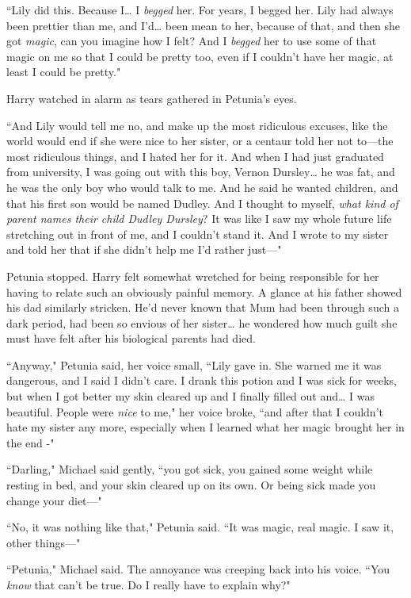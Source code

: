 ``Lily did this. Because I{\ldots} I \emph{begged} her. For years, I
begged her. Lily had always been prettier than me, and
I'd{\ldots} been mean to her, because of that, and then she
got \emph{magic}, can you imagine how I felt? And I \emph{begged} her
to use some of that magic on me so that I could be
pretty too, even if I couldn't have her magic, at least I
could be pretty."

Harry watched in alarm as tears gathered in Petunia's eyes.

``And Lily would tell me no, and make up the most
ridiculous excuses, like the world would end if she were
nice to her sister, or a centaur told her not to---the most
ridiculous things, and I hated her for it. And when I had
just graduated from university, I was going out with this
boy, Vernon Dursley{\ldots} he was fat, and he was the only boy
who would talk to me. And he said he wanted children,
and that his first son would be named Dudley. And I
thought to myself, \emph{what kind of parent names their child
Dudley Dursley}? It was like I saw my whole future life
stretching out in front of me, and I couldn't stand it. And
I wrote to my sister and told her that if she didn't help
me I'd rather just---"

Petunia stopped. Harry felt somewhat wretched for being
responsible for her having to relate such an obviously
painful memory. A glance at his father showed his dad
similarly stricken. He'd never known that Mum had been
through such a dark period, had been so envious of her
sister{\ldots} he wondered how much guilt she must have felt
after his biological parents had died.

``Anyway," Petunia said, her voice small, ``Lily gave in. She
warned me it was dangerous, and I said I didn't care. I
drank this potion and I was sick for weeks, but when I
got better my skin cleared up and I finally filled out and{\ldots}
I was beautiful. People were \emph{nice} to me," her voice broke,
``and after that I couldn't hate my sister any more,
especially when I learned what her magic brought her in
the end -"

``Darling," Michael said gently, ``you got sick, you gained
some weight while resting in bed, and your skin cleared up
on its own. Or being sick made you change your diet---"

``No, it was nothing like that," Petunia said. ``It was magic,
real magic. I saw it, other things---"

``Petunia," Michael said. The annoyance was creeping back
into his voice. ``You \emph{know} that can't be true. Do I really
have to explain why?"

